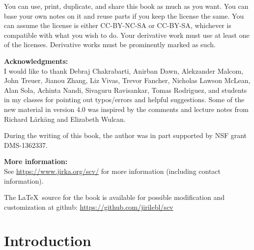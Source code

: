 \documentclass[12pt,openany]{book}
\theoremstyle{plain}
\theoremstyle{remark}
\theoremstyle{definition}
\theoremstyle{exercise}
\theoremstyle{example}
\begin{document}
\bigskip

\noindent
You can use, print, duplicate, and share this book as much as you want.  You can
base your own notes on it and reuse parts if you keep the license the
same.  You can assume the license is either CC-BY-NC-SA or CC-BY-SA\@,
whichever is compatible with what you wish to do.
Your derivative work must use at least one of the licenses.
Derivative works must be prominently marked as such.

\bigskip

\noindent
\textbf{Acknowledgments:}
\\
I would like to thank Debraj Chakrabarti, Anirban Dawn, Alekzander Malcom,
John Treuer, Jianou Zhang, Liz Vivas, Trevor Fancher,
Nicholas Lawson McLean, Alan Sola, Achinta Nandi,
Sivaguru Ravisankar,
Tomas Rodriguez,
and students in my classes for pointing out typos/errors
and helpful suggestions.
Some of the new material in version 4.0
was inspired by the comments and lecture notes from
Richard L\"ark\"ang and Elizabeth Wulcan.

\bigskip

\noindent
During the writing of this book,
the author was in part supported by NSF grant DMS-1362337.

\bigskip

\noindent
\textbf{More information:}
\\
See \url{https://www.jirka.org/scv/} for more information
(including contact information).

\medskip

\noindent
The \LaTeX\ source for the book is available
for possible modification and customization
at github: \url{https://github.com/jirilebl/scv}



\tableofcontents
{}



\chapter*{Introduction} \label{ch:intro}
\end{document}
